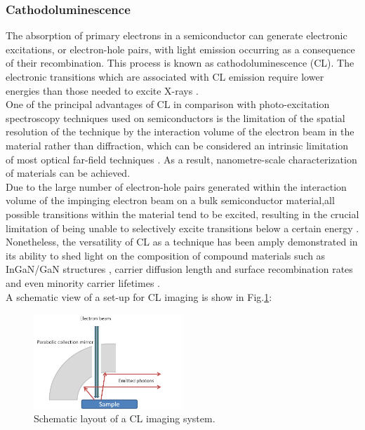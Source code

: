 \subsubsection{Cathodoluminescence}

The absorption of primary electrons in a semiconductor can generate electronic excitations, or electron-hole pairs, with light emission occurring as a consequence of their recombination. This process is known as cathodoluminescence (CL). The electronic transitions which are associated with CL emission require lower energies than those needed to excite X-rays \cite{DavidB.Williams2009}.\\
\indent One of the principal advantages of CL in comparison with photo-excitation spectroscopy techniques used on semiconductors is the limitation of the spatial resolution of the technique by the interaction volume of the electron beam in the material rather than diffraction, which can be considered an intrinsic limitation of most optical far-field techniques \cite{Edwards2011}. As a result, nanometre-scale characterization of materials can be achieved.\\
\indent Due to the large number of electron-hole pairs generated within the interaction volume of the impinging electron beam on a bulk semiconductor material,all possible transitions within the material tend to be excited, resulting in the crucial limitation of being unable to selectively excite transitions below a certain energy \cite{Edwards2011}. Nonetheless, the versatility of CL as a technique has been amply demonstrated in its ability to shed light on the composition of compound materials such as InGaN/GaN structures \cite{Martin2004}, carrier diffusion length and surface recombination rates \cite{Sercel1989} and even minority carrier lifetimes \cite{YacobiHolt1990}.\\
\indent A schematic view of a set-up for CL imaging is show in Fig.\ref{2.6}:

\begin{figure}[!ht]
	\centering
	\includegraphics[width=0.5\textwidth]{Figs/Ch2/CL.png}
	\caption[h] {Schematic layout of a CL imaging system.}
	\label{2.6}
\end{figure}
\FloatBarrier

